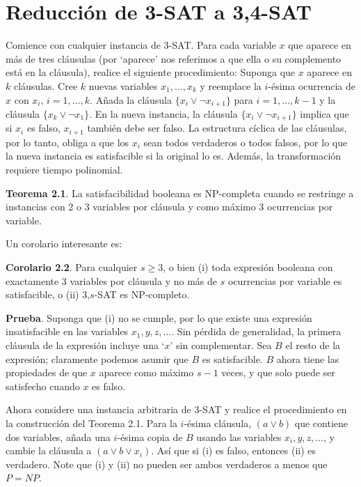 \documentclass{article}
\begin{document}
\section{Reducción de 3-SAT a 3,4-SAT}
Comience con cualquier instancia de 3-SAT. Para cada variable \(x\) que aparece en más de tres cláusulas (por ‘aparece’ nos referimos a que ella o su complemento está en la cláusula), realice el siguiente procedimiento: Suponga que \(x\) aparece en \(k\) cláusulas. Cree \(k\) nuevas variables \(x_1, \ldots, x_k\) y reemplace la \(i\)-ésima ocurrencia de \(x\) con \(x_i\), \(i = 1, \ldots, k\). Añada la cláusula \(\{x_i \lor \neg x_{i+1}\}\) para \(i=1, \ldots, k-1\) y la cláusula \(\{x_k \lor \neg x_1\}\). En la nueva instancia, la cláusula \(\{x_i \lor \neg x_{i+1}\}\) implica que si \(x_i\) es falso, \(x_{i+1}\) también debe ser falso. La estructura cíclica de las cláusulas, por lo tanto, obliga a que los \(x_i\) sean todos verdaderos o todos falsos, por lo que la nueva instancia es satisfacible si la original lo es. Además, la transformación requiere tiempo polinomial.

\textbf{Teorema 2.1}. La satisfacibilidad booleana es NP-completa cuando se restringe a instancias con 2 o 3 variables por cláusula y como máximo 3 ocurrencias por variable.

Un corolario interesante es:

\textbf{Corolario 2.2}. Para cualquier \(s \geq 3\), o bien (i) toda expresión booleana con exactamente 3 variables por cláusula y no más de \(s\) ocurrencias por variable es satisfacible, o (ii) 3,\(s\)-SAT es NP-completo. 

\textbf{Prueba}. Suponga que (i) no se cumple, por lo que existe una expresión insatisfacible en las variables \(x_1, y, z, \ldots\). Sin pérdida de generalidad, la primera cláusula de la expresión incluye una ‘\(x\)’ sin complementar. Sea \(B\) el resto de la expresión; claramente podemos asumir que \(B\) es satisfacible. \(B\) ahora tiene las propiedades de que \(x\) aparece como máximo \(s-1\) veces, y que solo puede ser satisfecho cuando \(x\) es falso.

Ahora considere una instancia arbitraria de 3-SAT y realice el procedimiento en la construcción del Teorema 2.1. Para la \(i\)-ésima cláusula, \((a \lor b)\) que contiene dos variables, añada una \(i\)-ésima copia de \(B\) usando las variables \(x_i, y, z, \ldots\), y cambie la cláusula a \((a \lor b \lor x_i)\). Así que si (i) es falso, entonces (ii) es verdadero. Note que (i) y (ii) no pueden ser ambos verdaderos a menos que \(P=NP\).
\end{document}
